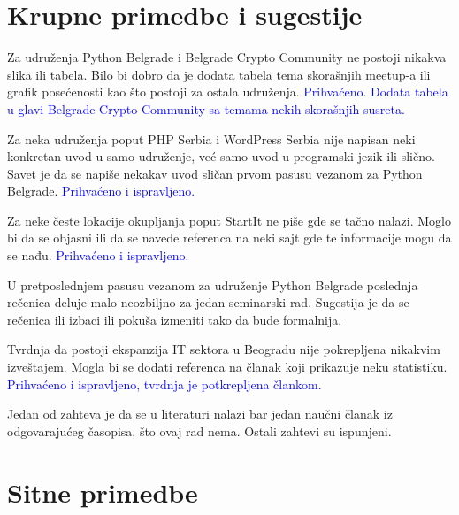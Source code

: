 \documentclass[a4paper]{report}
\newcommand{\odgovor}[1]{\textcolor{blue}{#1}}
\begin{document}
\section{Krupne primedbe i sugestije}

Za udruženja Python Belgrade i Belgrade Crypto Community ne postoji nikakva slika ili tabela. Bilo bi dobro da je dodata tabela tema skorašnjih meetup-a ili grafik posećenosti kao što postoji za ostala udruženja.
\odgovor{Prihvaćeno. Dodata tabela u glavi Belgrade Crypto Community sa temama nekih skorašnjih susreta.} %

Za neka udruženja poput PHP Serbia i WordPress Serbia nije napisan neki konkretan uvod u samo udruženje, već samo uvod u programski jezik ili slično. Savet je da se napiše nekakav uvod sličan prvom pasusu vezanom za Python Belgrade. 
\odgovor{Prihvaćeno i ispravljeno.}

Za neke česte lokacije okupljanja poput StartIt ne piše gde se tačno nalazi. Moglo bi da se objasni ili da se navede referenca na neki sajt gde te informacije mogu da se nađu. \odgovor{Prihvaćeno i ispravljeno.}

U pretposlednjem pasusu vezanom za udruženje Python Belgrade poslednja rečenica deluje malo neozbiljno za jedan seminarski rad. Sugestija je da se rečenica ili izbaci ili pokuša izmeniti tako da bude formalnija.\odgovor{} %

Tvrdnja da postoji ekspanzija IT sektora u Beogradu nije pokrepljena nikakvim izveštajem. Mogla bi se dodati referenca na članak koji prikazuje neku statistiku.
\odgovor{Prihvaćeno i ispravljeno, tvrdnja je potkrepljena člankom.}

Jedan od zahteva je da se u literaturi nalazi bar jedan naučni članak iz odgovarajućeg časopisa, što ovaj rad nema. Ostali zahtevi su ispunjeni.
\odgovor{} %

\section{Sitne primedbe}
\end{document}
